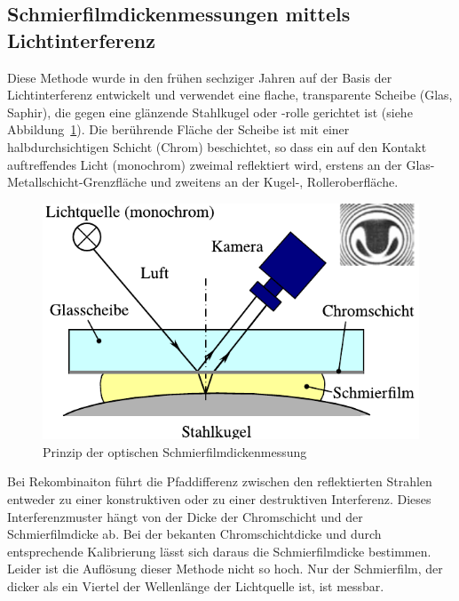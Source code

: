 \subsection{Schmierfilmdickenmessungen mittels Lichtinterferenz}
\label{sub:schmierfilmdickenmessung_mittels_lichtinterferenz}

Diese Methode wurde in den frühen sechziger Jahren auf der Basis der Lichtinterferenz entwickelt und verwendet eine flache, transparente Scheibe (Glas, Saphir), die gegen eine glänzende Stahlkugel oder -rolle gerichtet ist (siehe Abbildung~\ref{fig:ehd_pruefsprinzip_furtuna}).
Die berührende Fläche der Scheibe ist mit einer halbdurchsichtigen Schicht (Chrom) beschichtet, so dass ein auf den Kontakt auftreffendes Licht (monochrom) zweimal reflektiert wird, erstens an der Glas-Metallschicht-Grenzfläche und zweitens an der Kugel-, Rolleroberfläche.

\begin{figure}[htb]
    \centering
    \includegraphics[]{./images/ehd_pruefsprinzip_furtuna.pdf}
    \caption{Prinzip der optischen Schmierfilmdickenmessung \cite{furtuna_2011}}
    \label{fig:ehd_pruefsprinzip_furtuna}
\end{figure}

Bei Rekombinaiton führt die Pfaddifferenz zwischen den reflektierten Strahlen entweder zu einer konstruktiven oder zu einer destruktiven Interferenz.
Dieses Interferenzmuster hängt von der Dicke der Chromschicht und der Schmierfilmdicke ab.
Bei der bekanten Chromschichtdicke und durch entsprechende Kalibrierung lässt sich daraus die Schmierfilmdicke bestimmen.
Leider ist die Auflösung dieser Methode nicht so hoch.
Nur der Schmierfilm, der dicker als ein Viertel der Wellenlänge der Lichtquelle ist, ist messbar.

